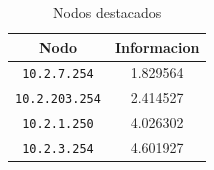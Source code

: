     \begin{table}[ht]\begin{center}
      \begin{tabular}{|c|c|}
      \hline
      \textbf{Nodo} & \textbf{Informacion} \\ \hline
      \texttt{10.2.7.254}& 1.829564 \\ \hline
      \texttt{10.2.203.254}& 2.414527 \\ \hline
      \texttt{10.2.1.250}& 4.026302 \\ \hline
      \texttt{10.2.3.254}& 4.601927 \\ \hline
      \end{tabular}
      \caption{Nodos destacados}
      \label{Nodos-destacados}
    \end{center}\end{table}
